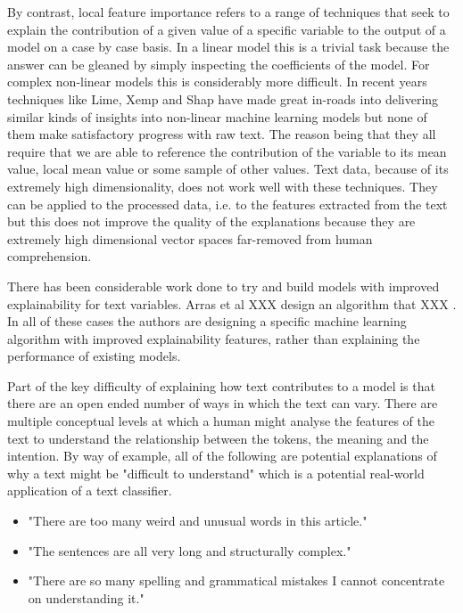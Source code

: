 \documentclass[12pt,a4paper]{article}
\numberwithin{equation}{section}
\begin{document}
By contrast, local feature importance refers to a range of techniques that seek to explain the contribution of a given
value of a specific variable to the output of a model on a case by case basis. In a linear model this is a trivial task
because the answer can be gleaned by simply inspecting the coefficients of the model. For complex non-linear models
this is considerably more difficult. In recent years techniques like Lime\cite{lime}, Xemp\cite{xemp} and Shap\cite{shap}
have made great in-roads into
delivering similar kinds of insights into non-linear machine learning models but none of them make satisfactory progress
with raw text. The reason being that they all require that we are able to reference the contribution of the variable to
its mean value, local mean value or some sample of other values. Text data, because of its extremely high dimensionality,
does not work well with these techniques. They can be applied to the processed data, i.e. to the features extracted from
the text but this does not improve the quality of the explanations because they are extremely high dimensional vector
spaces far-removed from human comprehension.

There has been considerable work done to try and build models with improved explainability for text variables. 
Arras et al XXX design an algorithm that XXX \cite{Arras2017}. In all of these cases the authors are designing a specific machine learning algorithm
with improved explainability features, rather than explaining the performance of existing models.

Part of the key difficulty of explaining how text contributes to a model is that there are an open ended number of ways in
which the text can vary. There are multiple conceptual levels at which a human might analyse the features of the text
to understand the relationship between the tokens, the meaning and  the intention. By way of example, all of the following
are potential explanations of why a text might be "difficult to understand" which is a potential real-world application of a
text classifier.

\begin{itemize}
   \item "There are too many weird and unusual words in this article."
   \item "The sentences are all very long and structurally complex."
   \item "There are so many spelling and grammatical mistakes I cannot concentrate on understanding it."
\end{itemize}
\end{document}
